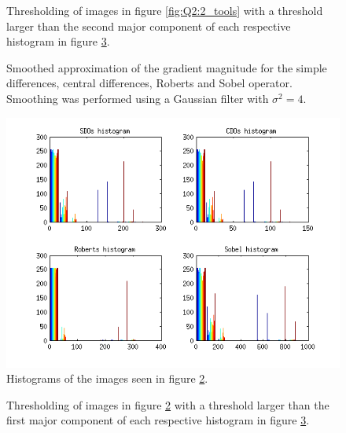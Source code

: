 \begin{figure}[H]
	\centering
	\scalebox{0.9}{}
	\caption{Thresholding of images in figure \ref{fig:Q2:2_tools} with a
    threshold larger than the second major component of
	  each respective histogram in figure \ref{fig:Q2:histogram_tools}.}
	\label{fig:Q2:threshold_tools_2}
\end{figure}


\begin{figure}[H]
	\centering
	\scalebox{0.7}{}
	\caption{Smoothed approximation of the gradient magnitude for the
    simple differences, central differences, Roberts and Sobel operator.
    Smoothing was performed using a Gaussian filter with $\sigma^2 = 4$.}
	\label{fig:Q2:2_tools_smoothed}
\end{figure}

\begin{figure}[H]
	\centering
	\includegraphics[scale=0.8]{./images/Q2/tools_smoothed/histogram_1.png}
	\caption{Histograms of the images seen in figure \ref{fig:Q2:2_tools_smoothed}.}
	\label{fig:Q2:histogram_tools}
\end{figure}


\begin{figure}[H]
	\centering
	\scalebox{0.9}{}
	\caption{Thresholding of images in figure \ref{fig:Q2:2_tools_smoothed}
    with a threshold larger than the first major component of
	  each respective histogram in figure \ref{fig:Q2:histogram_tools}.}
	\label{fig:Q2:threshold_tools_smoothed_1}
\end{figure}

